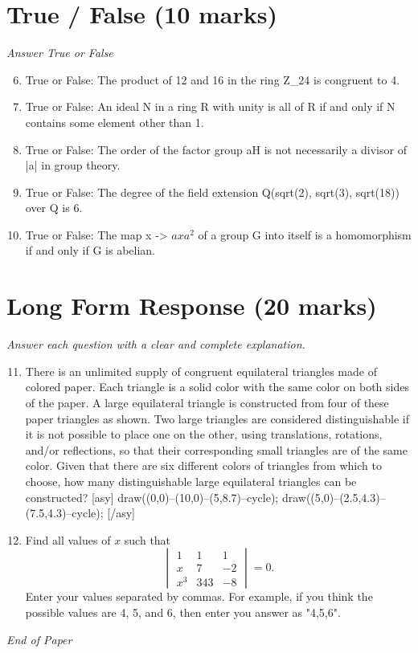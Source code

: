\documentclass[12pt]{article}
\begin{document}
\section*{True / False (10 marks)}
\textit{Answer True or False}
\begin{enumerate}[label=\arabic*.]
\setcounter{enumi}{5}
\item True or False: The product of 12 and 16 in the ring Z\_24 is congruent to 4.
\item True or False: An ideal N in a ring R with unity is all of R if and only if N contains some element other than 1.
\item True or False: The order of the factor group aH is not necessarily a divisor of |a| in group theory.
\item True or False: The degree of the field extension Q(sqrt(2), sqrt(3), sqrt(18)) over Q is 6.
\item True or False: The map x -\textgreater{} $axa^2$ of a group G into itself is a homomorphism if and only if G is abelian.
\end{enumerate}

\section*{Long Form Response (20 marks)}
\textit{Answer each question with a clear and complete explanation.}
\begin{enumerate}[label=\arabic*.]
\setcounter{enumi}{10}
\item There is an unlimited supply of congruent equilateral triangles made of colored paper. Each triangle is a solid color with the same color on both sides of the paper. A large equilateral triangle is constructed from four of these paper triangles as shown. Two large triangles are considered distinguishable if it is not possible to place one on the other, using translations, rotations, and/or reflections, so that their corresponding small triangles are of the same color. Given that there are six different colors of triangles from which to choose, how many distinguishable large equilateral triangles can be constructed? [asy] draw((0,0)--(10,0)--(5,8.7)--cycle); draw((5,0)--(2.5,4.3)--(7.5,4.3)--cycle); [/asy]
\item Find all values of $x$ such that \[ \begin{vmatrix} 1 & 1 & 1 \\ x & 7 & -2 \\ x^3 & 343 & -8 \end{vmatrix} = 0.\]Enter your values separated by commas. For example, if you think the possible values are 4, 5, and 6, then enter you answer as "4,5,6".
\end{enumerate}

\vfill
\noindent\textit{End of Paper}
\end{document}
